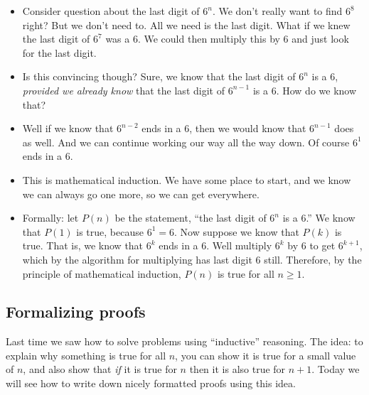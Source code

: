 \documentclass[12pt]{article}
\theoremstyle{plain}
\theoremstyle{definition}
\theoremstyle{remark}
\newcommand{\todayis}[1]{\clearpage{\rhead{\footnotesize #1}}}
\begin{document}
\begin{itemize}
\item Consider question about the last digit of $6^n$.   We don't really want to find $6^8$ right?  But we don't need to.  All we need is the last digit.  What if we knew the last digit of $6^7$ was a 6.  We could then multiply this by $6$ and just look for the last digit.
\item Is this convincing though?  Sure, we know that the last digit of $6^n$ is a 6, {\em provided we already know} that the last digit of $6^{n-1}$ is a 6.  How do we know that?
\item Well if we know that $6^{n-2}$ ends in a 6, then we would know that $6^{n-1}$ does as well.  And we can continue working our way all the way down.  Of course $6^1$ ends in a 6.
\item This is mathematical induction.  We have some place to start, and we know we can always go one more, so we can get everywhere.
\item Formally: let $P(n)$ be the statement, ``the last digit of $6^n$ is a 6.''  We know that $P(1)$ is true, because $6^1 = 6$.  Now suppose we know that $P(k)$ is true.  That is, we know that $6^k$ ends in a 6.  Well multiply $6^k$ by 6 to get $6^{k+1}$, which by the algorithm for multiplying has last digit 6 still.  Therefore, by the principle of mathematical induction, $P(n)$ is true for all $n \ge 1$.








\end{itemize}



\todayis{Wednesday, October 12}

\subsection*{Formalizing proofs}

Last time we saw how to solve problems using ``inductive'' reasoning.  The idea: to explain why something is true for all $n$, you can show it is true for a small value of $n$, and also show that \emph{if} it is true for $n$ then it is also true for $n+1$.  Today we will see how to write down nicely formatted proofs using this idea.
\end{document}
